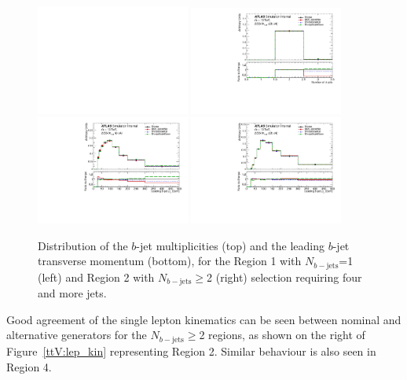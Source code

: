 \begin{figure}[!htb]
\centering
\includegraphics[width=0.45\textwidth]{Plots/ttV/dummy}
\includegraphics[width=0.45\textwidth]{Plots/ttV/shape/c_Region_1_nBtagJets}\\
\includegraphics[width=0.45\textwidth]{Plots/ttV/shape/c_Region_0_Bjet_Pt_0}
\includegraphics[width=0.45\textwidth]{Plots/ttV/shape/c_Region_1_Bjet_Pt_0}\\
  \caption{Distribution of the $b$-jet multiplicities (top) and the leading $b$-jet transverse momentum (bottom), for the Region 1 with $N_{b-\mathrm{jets}}$=1 (left) and Region 2 with $N_{b-\mathrm{jets}}\geq$2 (right) selection requiring four and more jets.  \label{ttV:4jbinfo}}
\end{figure}

Good agreement of the single lepton kinematics can be seen between nominal and alternative generators for the $N_{b-\mathrm{jets}}\geq$2 regions, as shown on the right of Figure~\ref{ttV:lep_kin} representing Region 2. Similar behaviour is also seen in Region 4.


